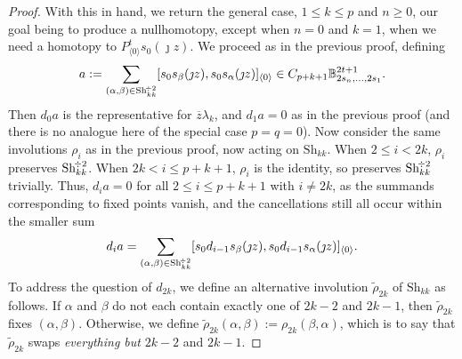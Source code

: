 \documentclass[11pt]{amsart} \renewcommand{\baselinestretch}{1.2}
\theoremstyle{plain}
\numberwithin{equation}{section} %
\theoremstyle{plain}
\numberwithin{equation}{chapter} %
\newcommand{\Shuffles}[2]{\mathrm{Sh}_{#1#2}}
\newcommand{\HalfShuffles}[2]{\mathrm{Sh}_{#1#2}^{\smash{\!\div2}}}
\begin{document}
\begin{Koszul complexes}
\begin{proof}
With this in hand, we return the general case, $1\leq k\leq p$ and $n\geq0$, our goal being to produce a nullhomotopy, except when $n=0$ and $k=1$, when we need a homotopy to $P^t_{\langle 0\rangle}s_0(\jmath z)$. We proceed as in the previous proof, defining
\[a:=\sum_{(\alpha,\beta)\in\HalfShuffles{k}{k}}[s_{0}s_\beta(\jmath z), s_{0}s_\alpha(\jmath z)]_{\langle 0\rangle}\in C_{p+k+1}\mathbb{B}_{2s_n,\ldots,2s_1}^{2t+1}.\]
Then $d_0a$ is the representative for $\overline{z}\lambda_k$, and $d_1a=0$ as in the previous proof (and there is no analogue here of the special case $p=q=0$). Now consider the same involutions $\rho_i$ as in the previous proof, now acting on $\Shuffles{k}{k}$. When $2\leq i< 2k$, $\rho_i$ preserves $\HalfShuffles{k}{k}$. When $2k<i\leq p+k+1$, $\rho_i$ is the identity, so preserves $\HalfShuffles{k}{k}$ trivially. Thus, $d_ia=0$ for all $2\leq i\leq p+k+1$ with $i\neq2k$, as the summands corresponding to fixed points vanish, and the cancellations still all occur within the smaller sum
\[d_{i}a=\sum_{(\alpha,\beta)\in\HalfShuffles{k}{k}} [s_{0}d_{i-1}s_\beta(\jmath z), s_{0}d_{i-1}s_\alpha(\jmath z)]_{\langle 0\rangle}.\]
To address the question of $d_{2k}$, we define an alternative involution $\widetilde{\rho}_{2k}$ of $\Shuffles{k}{k}$ as follows.  If $\alpha$ and $\beta$ do not each contain exactly one of $2k-2$ and $2k-1$, then $\widetilde{\rho}_{2k}$ fixes $(\alpha,\beta)$. Otherwise, we define $\widetilde{\rho}_{2k}(\alpha,\beta):=\rho_{2k}(\beta,\alpha)$, which is to say that $\widetilde{\rho}_{2k}$ swaps \emph{everything but} $2k-2$ and $2k-1$.


\end{proof}
\end{Koszul complexes}
\end{document}
